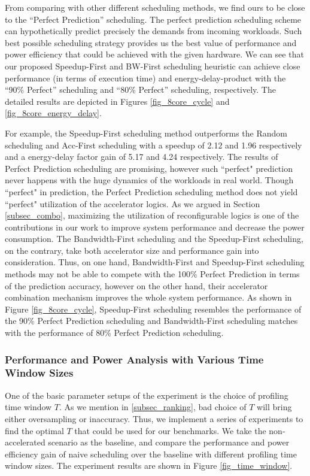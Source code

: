 From comparing with other different scheduling methods, we find ours
to be close to the ``Perfect Prediction'' scheduling. The perfect
prediction scheduling scheme can hypothetically predict precisely
the demands from incoming workloads. Such best possible scheduling
strategy provides us the best value of performance and power
efficiency that could be achieved with the given hardware. We can see that our proposed Speedup-First and BW-First scheduling heuristic can achieve close performance (in terms of execution time) and energy-delay-product with the ``90\% Perfect'' scheduling and ``80\% Perfect'' scheduling, respectively. The detailed
results are depicted in Figures \ref{fig_8core_cycle} and \ref{fig_8core_energy_delay}.  

For example, the Speedup-First scheduling method outperforms the
Random scheduling and Acc-First scheduling with a speedup of 2.12 and
1.96 respectively and a energy-delay factor gain of 5.17 and 4.24
respectively. The results of Perfect Prediction scheduling are
promising, however such ``perfect" prediction never happens with the
huge dynamics of the workloads in real world. Though ``perfect" in
prediction, the Perfect Prediction scheduling method does not yield
``perfect" utilization of the accelerator logics. 
As we argued in Section \ref{subsec_combo}, maximizing the utilization of reconfigurable logics is one of the contributions in our work to improve system performance and decrease the power consumption. The Bandwidth-First scheduling and the Speedup-First scheduling, on the contrary, take both accelerator size and performance gain into consideration. Thus, on one hand, Bandwidth-First and Speedup-First scheduling methods may not be able to compete with the 100\% Perfect Prediction in terms of the prediction accuracy, however on the other hand, their accelerator combination mechanism improves the whole system performance. As shown in Figure \ref{fig_8core_cycle}, Speedup-First scheduling resembles the performance of the 90\% Perfect Prediction scheduling and Bandwidth-First scheduling matches with the performance of 80\% Perfect Prediction scheduling. 
\fi

\subsubsection{Performance and Power Analysis with Various Time Window Sizes}
One of the basic parameter setups of the experiment is the choice of profiling time window $T$. As we mention in \ref{subsec_ranking}, bad choice of $T$ will bring either oversampling or inaccuracy. Thus, we implement a series of experiments to find the optimal $T$ that could be used for our benchmarks. 
We take the non-accelerated scenario as the baseline, and compare the performance and power efficiency gain of naive scheduling over the baseline with different profiling time window sizes. The experiment results are shown in Figure \ref{fig_time_window}.

